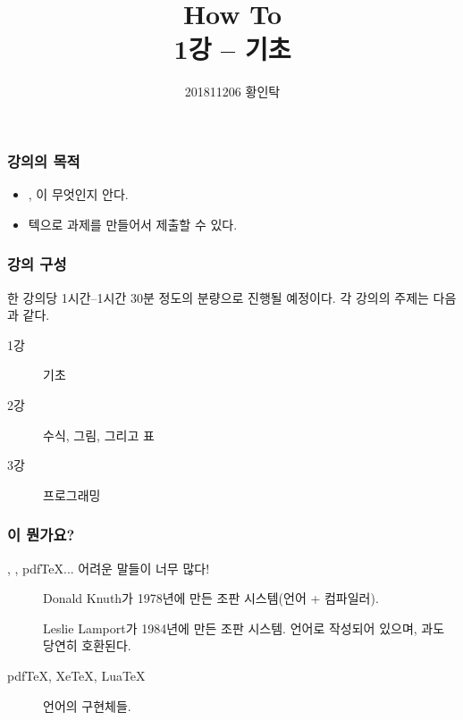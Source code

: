 

\usepackage{subfig}

\usepackage{tikz, pgfplots}
\usepackage{tkz-euclide}
\usepackage[american, cuteinductors]{circuitikz}
\usepackage{schemabloc}
\pgfplotsset{compat=newest}
\tikzexternalize

\usepackage{minted}

\title{How To \latex{} \\ \normalsize \textnormal{1강 -- \latex{} 기초}}
\author{201811206 황인탁}


\maketitle

\begin{frame}
    \frametitle{강의의 목적}

    \begin{itemize}
        \item \tex{}, \latex{}이 무엇인지 안다.
        \item 텍으로 과제를 만들어서 제출할 수 있다.
    \end{itemize}

\end{frame}

\begin{frame}
    \frametitle{강의 구성}

    한 강의당 1시간--1시간 30분 정도의 분량으로 진행될 예정이다. 각 강의의 주제는 다음과 같다.

    \begin{description}
        \item[1강] \latex{} 기초
        \item[2강] 수식, 그림, 그리고 표
        \item[3강] \latex{} 프로그래밍
    \end{description}

\end{frame}

\begin{frame}
    \frametitle{\tex{}이 뭔가요?}

    \tex{}, \latex{}, pdfTeX... 어려운 말들이 너무 많다!

    \begin{description}
        \item[\tex{}] Donald Knuth가 1978년에 만든 조판 시스템(언어 + 컴파일러).
        \item[\latex{}] Leslie Lamport가 1984년에 만든 조판 시스템. \tex{} 언어로 작성되어 있으며, \tex{}과도 당연히 호환된다.
        \item[pdfTeX, XeTeX, LuaTeX] \tex{} 언어의 구현체들.
    \end{description}

\end{frame}

